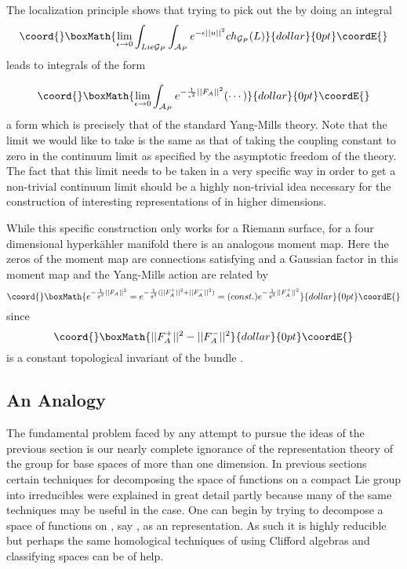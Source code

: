 \documentclass[a4paper,a4paper]{article}
\theoremstyle{conjecture}
\begin{document}
The localization
principle shows that trying to pick out the \coordHE{}
by doing an integral 
$$\coord{}\boxMath{\lim_{\epsilon\rightarrow 0}\int_{Lie{\mathcal G}_P}\int_{{\mathcal A}_P}e^{-\epsilon ||u||^2}ch_{{\mathcal G}_P}(L)}{dollar}{0pt}\coordE{}$$
leads to integrals of the form

$$\coord{}\boxMath{\lim_{\epsilon\rightarrow 0} \int_{{\mathcal A}_P} e^{-\frac{1}{\epsilon ^2}{||F_A||^2}}(\cdots)}{dollar}{0pt}\coordE{}$$
a form which is precisely that of the standard Yang-Mills theory.  Note that the limit \myHighlight{$\epsilon\rightarrow$}\coordHE{} we
would like to take is the same as that of taking the coupling constant to zero in the continuum limit as
specified by the asymptotic freedom of the theory.  The fact that this limit needs to be taken in a very
specific way in order to get a non-trivial continuum limit should be a highly non-trivial idea necessary
for the construction of interesting representations of \coordHE{} in higher dimensions.

While this specific construction only works for a Riemann surface, for a four dimensional hyperk\"ahler
manifold there is an analogous moment map. Here the zeros of the moment map are connections satisfying
\coordHE{} and a Gaussian factor in this moment map and the Yang-Mills action are related by
$$\coord{}\boxMath{e^{-\frac{1}{g^2}||F_A||^2}=e^{-\frac{1}{g^2}(||F^+_A||^2+||F^-_A||^2)}=(const.)e^{-\frac{1}{g^2}||F^+_A||^2}}{dollar}{0pt}\coordE{}$$
since 
$$\coord{}\boxMath{||F^+_A||^2-||F^-_A||^2}{dollar}{0pt}\coordE{}$$
is a constant topological invariant of the bundle \coordHE{}.

\subsection{An Analogy}

The fundamental problem faced by any attempt to pursue the ideas of the previous section is
our nearly complete ignorance of the representation theory of the group \coordHE{} for
base spaces of more than one dimension.  In previous sections certain techniques for
decomposing 
the space of functions on a compact Lie group \coordHE{} into irreducibles were explained in great detail partly because many of
the same techniques may be useful in the \coordHE{} case.  One can begin by trying to decompose
a space of functions on \coordHE{}, say \coordHE{}, as an \coordHE{} representation.  As such it is
highly reducible but perhaps the same homological techniques of using Clifford algebras and
classifying spaces can be of help.  
\end{document}
